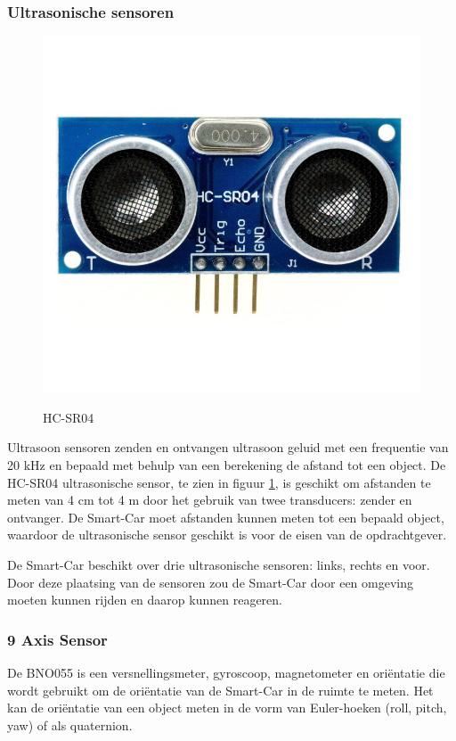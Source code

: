 \subsubsection{Ultrasonische sensoren}
\begin{figure}[h]
    \centering
    \includegraphics[scale = 0.2]{Media/Figuren/HCSR04-hardware.jpg}
    \caption{HC-SR04}
    \label{HC-SR04-component}
    \cite{HC-SR04-image-RL} 
\end{figure}
Ultrasoon sensoren zenden en ontvangen ultrasoon geluid met een frequentie van 20 kHz en bepaald met behulp van een berekening de afstand tot een object. De HC-SR04 ultrasonische sensor, te zien in figuur \ref{HC-SR04-component}\cite{HC-SR04-image-RL}, is geschikt om afstanden te meten van 4 cm tot 4 m door het gebruik van twee \gls{transducer}s: zender en ontvanger. De \gls{Smart-Car} moet afstanden kunnen meten tot een bepaald object, waardoor de ultrasonische sensor geschikt is voor de eisen van de opdrachtgever\cite{HC-SR04}.

De \gls{Smart-Car} beschikt over drie ultrasonische sensoren: links, rechts en voor. Door deze plaatsing van de sensoren zou de \gls{Smart-Car} door een omgeving moeten kunnen rijden en daarop kunnen reageren. 

\subsubsection{9 Axis Sensor}
De BNO055\cite{AXIS} is een versnellingsmeter, gyroscoop, magnetometer en oriëntatie die wordt gebruikt om de oriëntatie van de \gls{Smart-Car} in de ruimte te meten. Het kan de oriëntatie van een object meten in de vorm van Euler-hoeken (roll, pitch, yaw) of als quaternion.


